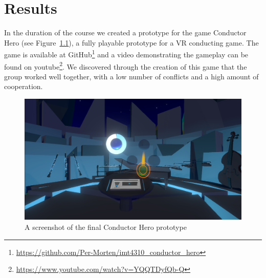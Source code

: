 \chapter{Results} \label{chap:results}
In the duration of the course we created a prototype for the game Conductor Hero (see Figure~\ref{fig:conductor_hero}), a fully playable prototype for a VR conducting game. The game is available at GitHub\footnote{\url{https://github.com/Per-Morten/imt4310_conductor_hero}} and a video demonstrating the gameplay can be found on youtube\footnote{\url{https://www.youtube.com/watch?v=YQQTDyfQb-Q}}. 
We discovered through the creation of this game that the group worked well together, with a low number of conflicts and a high amount of cooperation.
\\ 
\begin{figure}[tpbh]
    \centering
    \includegraphics[width=1.0\textwidth]{images/cue}
    \caption[Screenshot of Conductor Hero]{A screenshot of the final Conductor Hero prototype}
    \label{fig:conductor_hero}
\end{figure}